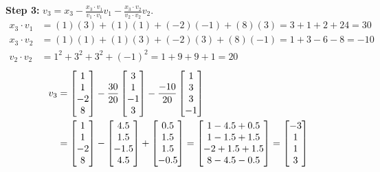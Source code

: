 \documentclass[11pt, letterpaper]{article}
\theoremstyle{definition}
\theoremstyle{remark}
\begin{document}
\textbf{Step 3:} $v_3 = x_3 - \frac{x_3 \cdot v_1}{v_1 \cdot v_1}v_1 - \frac{x_3 \cdot v_2}{v_2 \cdot v_2}v_2$.
\begin{align*}
    x_3 \cdot v_1 &= (1)(3) + (1)(1) + (-2)(-1) + (8)(3) = 3 + 1 + 2 + 24 = 30 \\
    x_3 \cdot v_2 &= (1)(1) + (1)(3) + (-2)(3) + (8)(-1) = 1 + 3 - 6 - 8 = -10 \\
    v_2 \cdot v_2 &= 1^2 + 3^2 + 3^2 + (-1)^2 = 1 + 9 + 9 + 1 = 20
\end{align*}
\begin{align*}
    v_3 &= \begin{bmatrix} 1 \\ 1 \\ -2 \\ 8 \end{bmatrix} - \frac{30}{20} \begin{bmatrix} 3 \\ 1 \\ -1 \\ 3 \end{bmatrix} - \frac{-10}{20} \begin{bmatrix} 1 \\ 3 \\ 3 \\ -1 \end{bmatrix} \\ \relax
    &= \begin{bmatrix} 1 \\ 1 \\ -2 \\ 8 \end{bmatrix} - \begin{bmatrix} 4.5 \\ 1.5 \\ -1.5 \\ 4.5 \end{bmatrix} + \begin{bmatrix} 0.5 \\ 1.5 \\ 1.5 \\ -0.5 \end{bmatrix} = \begin{bmatrix} 1 - 4.5 + 0.5 \\ 1 - 1.5 + 1.5 \\ -2 + 1.5 + 1.5 \\ 8 - 4.5 - 0.5 \end{bmatrix} = \begin{bmatrix} -3 \\ 1 \\ 1 \\ 3 \end{bmatrix}
\end{align*}
\end{document}
